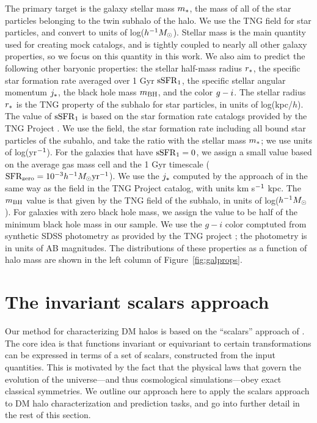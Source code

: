 The primary target is the galaxy stellar mass $m_*$, the mass of all of the star particles belonging to the twin \hydro subhalo of the \dark halo.
We use the TNG field  for star particles, and convert to units of log($h^{-1} M_\mathrm{\odot}$).
Stellar mass is the main quantity used for creating mock catalogs, and is tightly coupled to nearly all other galaxy properties, so we focus on this quantity in this work.
We also aim to predict the following other baryonic properties: 
the stellar half-mass radius $r_*$, the specific star formation rate averaged over 1 Gyr $\mathrm{sSFR}_1$, the specific stellar angular momentum $j_*$, the black hole mass $m_\mathrm{BH}$, and the color $g-i$. 
The stellar radius $r_*$ is the TNG property  of the subhalo for star particles, in units of log(kpc/$h$).
The value of $\mathrm{sSFR}_1$ is based on the star formation rate catalogs provided by the TNG Project \citep{donnari_star-formation_2019,pillepich_first_2019}.
We use the  field, the star formation rate including all bound star particles of the subahlo, and take the ratio with the stellar mass $m_*$; we use units of log(yr$^{-1}$).
For the galaxies that have $\mathrm{sSFR}_1=0$, we assign a small value based on the average gas mass cell and the 1 Gyr timescale ($\text{SFR}_\mathrm{zero} = 10^{-3} h^{-1} M_\mathrm{\odot} \text{yr}^{-1}$).
We use the $j_*$ computed by the approach of \cite{genel_galactic_2015} in the same way as the  field in the TNG Project catalog, with units km s$^{-1}$ kpc. 
The $m_\mathrm{BH}$ value is that given by the TNG field  of the subhalo, in units of log($h^{-1} M_\mathrm{\odot}$).
For galaxies with zero black hole mass, we assign the value to be half of the minimum black hole mass in our sample. 
We use the $g-i$ color comptuted from synthetic SDSS photometry as provided by the TNG project \citep{nelson_first_2018}; the photometry is in units of AB magnitudes. 
The distributions of these properties as a function of \dark halo mass are shown in the left column of Figure~\ref{fig:galprops}.


\section{The invariant scalars approach}
\label{sec:scalars_approach}

Our method for characterizing DM halos is based on the ``scalars'' approach of \cite{Villar2021a}.
The core idea is that functions invariant or equivariant to certain transformations can be expressed in terms of a set of scalars, constructed from the input quantities.  
This is motivated by the fact that the physical laws that govern the evolution of the universe---and thus cosmological simulations---obey exact classical symmetries.
We outline our approach here to apply the scalars approach to DM halo characterization and prediction tasks, and go into further detail in the rest of this section.

